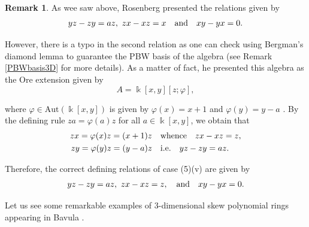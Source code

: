 \documentclass{amsart}
\theoremstyle{definition}
\newtheorem{remark}[theorem]{Remark}
\theoremstyle{remark}
\numberwithin{equation}{section}
\begin{document}
\begin{remark}\label{Rosenberg}
As wee saw above, Rosenberg \cite[Theorem C4.3.1, case (5)(v), p. 101]{Rosenberg1995} presented the relations given by
\[
yz-zy=az,\ zx-xz=x \quad {\rm and} \quad xy-yx=0.
\]

However, there is a typo in the second relation as one can check using Bergman's diamond lemma \cite{Bergman1978} to guarantee the PBW basis of the algebra (see Remark \ref{PBWbasis3D} for more details). As a matter of fact, he presented this algebra as the Ore extension \cite{Ore1933} given by
\[
A = \Bbbk[x,y][z;\varphi],
\]

where $\varphi\in\mathrm{Aut}(\Bbbk[x,y])$ is given by $\varphi(x)=x+1$ and $\varphi(y)=y-a$ \cite[p. 108]{Rosenberg1995}. By the defining rule $za=\varphi(a)z$ for all $a\in \Bbbk[x,y]$, we obtain that
\begin{align*}
zx=\varphi(x)z=(x+1)z &\quad {\rm whence} \quad  zx-xz=z, \\
zy=\varphi(y)z=(y-a)z &\quad {\rm i.e.} \quad yz-zy=az.
\end{align*}

Therefore, the correct defining relations of case (5)(v) are given by 
\[
yz - zy = az,\ zx - xz = z,\quad {\rm and}\quad xy - yx = 0.
\]
\end{remark}

Let us see some remarkable examples of 3-dimensional skew polynomial rings appearing in Bavula \cite{Bavula2023}.
\end{document}
